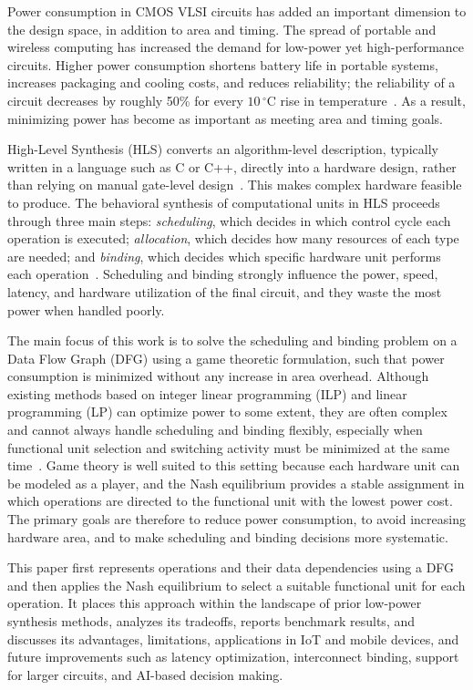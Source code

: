 \documentclass[conference]{IEEEtran}
\begin{document}
Power consumption in CMOS VLSI circuits has added an important
dimension to the design space, in addition to area and timing. The
spread of portable and wireless computing has increased the demand for
low-power yet high-performance circuits. Higher power consumption
shortens battery life in portable systems, increases packaging and
cooling costs, and reduces reliability; the reliability of a circuit
decreases by roughly 50\% for every $10\,^{\circ}\mathrm{C}$ rise in
temperature~\cite{small1994}. As a result, minimizing power has become
as important as meeting area and timing goals.

High-Level Synthesis (HLS) converts an algorithm-level description,
typically written in a language such as C or C++, directly into a
hardware design, rather than relying on manual gate-level
design~\cite{gajski1992}. This makes complex hardware feasible to
produce. The behavioral synthesis of computational units in HLS
proceeds through three main steps: \emph{scheduling}, which decides in
which control cycle each operation is executed; \emph{allocation},
which decides how many resources of each type are needed; and
\emph{binding}, which decides which specific hardware unit performs
each operation~\cite{benini2000}. Scheduling and binding strongly
influence the power, speed, latency, and hardware utilization of the
final circuit, and they waste the most power when handled poorly.

The main focus of this work is to solve the scheduling and binding
problem on a Data Flow Graph (DFG) using a game theoretic formulation,
such that power consumption is minimized without any increase in area
overhead. Although existing methods based on integer linear programming
(ILP) and linear programming (LP) can optimize power to some extent,
they are often complex and cannot always handle scheduling and binding
flexibly, especially when functional unit selection and switching
activity must be minimized at the same
time~\cite{shiue2000}. Game theory is well suited to this setting
because each hardware unit can be modeled as a player, and the Nash
equilibrium provides a stable assignment in which operations are
directed to the functional unit with the lowest power cost. The primary
goals are therefore to reduce power consumption, to avoid increasing
hardware area, and to make scheduling and binding decisions more
systematic.

This paper first represents operations and their data dependencies
using a DFG and then applies the Nash equilibrium to select a suitable
functional unit for each operation. It places this approach within the
landscape of prior low-power synthesis methods, analyzes its tradeoffs,
reports benchmark results, and discusses its advantages, limitations,
applications in IoT and mobile devices, and future improvements such as
latency optimization, interconnect binding, support for larger
circuits, and AI-based decision making.
\end{document}
